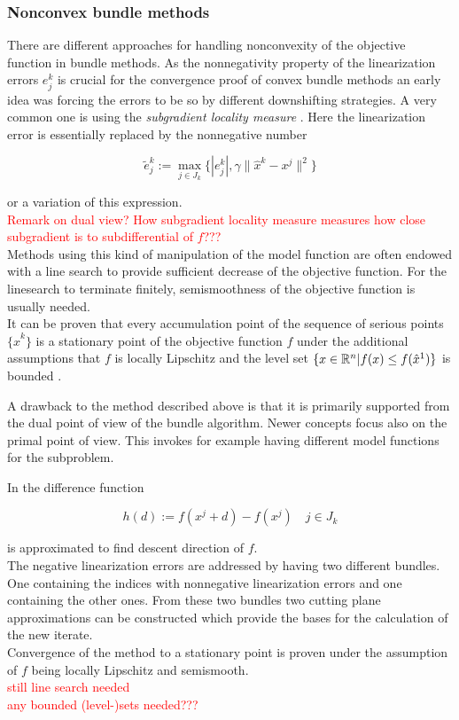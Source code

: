 \subsubsection{Nonconvex bundle methods}
There are different approaches for handling nonconvexity of the objective function in bundle methods.
As the nonnegativity property of the linearization errors \(e_j^k\) is crucial for the convergence proof of convex bundle methods an early idea was forcing the errors to be so by different downshifting strategies. A very common one is using the \emph{subgradient locality measure} \cite{Kiwiel1986, Mifflin1982}. Here the linearization error is essentially replaced by the nonnegative number

\begin{equation}
	\tilde{e}_j^k := \max_{j \in J_k} \{|e_j^k|,\gamma \|\hat{x}^k-x^j\|^2\}
\label{subgr_loc_measure}
\end{equation}

or a variation of this expression. \\
\textcolor{red}{Remark on dual view? How subgradient locality measure measures how close subgradient is to subdifferential of \(f\)???} \\
Methods using this kind of manipulation of the model function are often endowed with a line search to provide sufficient decrease of the objective function. For the linesearch to terminate finitely, semismoothness of the objective function is usually needed. \\
It can be proven that every accumulation point of the sequence of serious points \(\{\hat{x}^k\}\) is a stationary point of the objective function \(f\) under the additional assumptions that \(f\) is locally Lipschitz and the level set \(\{x \in \mathbb{R}^n | f(x) \leq f(\hat{x}^1)\}\) is bounded \cite{Haarala2007}.

A drawback to the method described above is that it is primarily supported from the dual point of view of the bundle algorithm. Newer concepts focus also on the primal point of view. This invokes for example having different model functions for the subproblem.

In \cite{Fuduli2004, Fuduli2004a} the difference function 

\begin{equation}
	h(d):= f(x^j +d) -f(x^j) \quad j \in J_k
\label{diff_fun}
\end{equation}

is approximated to find descent direction of \(f\). \\
The negative linearization errors are addressed by having two different bundles. One containing the indices with nonnegative linearization errors and one containing the other ones. From these two bundles two cutting plane approximations can be constructed which provide the bases for the calculation of the new iterate.  \\
Convergence of the method to a stationary point is proven under the assumption of \(f\) being locally Lipschitz and semismooth.\\
\textcolor{red}{still line search needed \\
any bounded (level-)sets needed???} 

